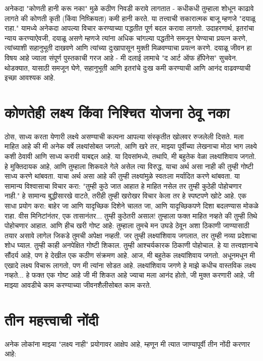 अनेकदा "कोणती हानी करू नका" मुळे कठीण निवडी करावे लागतात - कधीकधी तुम्हाला शोधून काढावे लागते की कोणती कृती (किंवा निष्क्रियता) कमी हानी करते.
या तत्त्वाची सकारात्मक बाजू म्हणजे "दयाळू राहा." यामध्ये अनेकदा आपल्या विचार करण्याच्या पद्धतीत पूर्ण बदल करावा लागतो. उदाहरणार्थ, इतरांचा न्याय करण्याऐवजी, दयाळू असणे म्हणजे त्यांना अधिक चांगल्या पद्धतीने समजून घेण्याचा प्रयत्न करणे, त्यांच्याशी सहानुभूती दाखवणे आणि त्यांच्या दुःखापासून मुक्ती मिळवण्याचा प्रयत्न करणे.
दयाळू जीवन हा विषय आहे ज्याला संपूर्ण पुस्तकाची गरज आहे - मी दलाई लामाचे "द आर्ट ऑफ हॅपिनेस" सुचवेन. थोडक्यात, यासाठी समजून घेणे, सहानुभूती आणि इतरांचे दुःख कमी करण्याची आणि आनंद वाढवण्याची इच्छा आवश्यक आहे.

\chapter{कोणतेही लक्ष्य किंवा निश्चित योजना ठेवू नका}
ठोस, साध्य करता येणारी लक्ष्ये असण्याची कल्पना आपल्या संस्कृतीत खोलवर रुजलेली दिसते. मला माहित आहे की मी अनेक वर्षे लक्ष्यांसोबत जगलो, आणि खरे तर, माझ्या पूर्वीच्या लेखनाचा मोठा भाग लक्ष्ये कशी ठेवावी आणि साध्य करावी याबद्दल आहे.
या दिवसांमध्ये, तथापि, मी बहुतेक वेळा लक्ष्यांशिवाय जगतो. हे मुक्तिदायक आहे, आणि तुम्हाला शिकवले गेले असेल त्या विरुद्ध, याचा अर्थ असा नाही की तुम्ही गोष्टी साध्य करणे थांबवता.
याचा अर्थ असा आहे की तुम्ही लक्ष्यांमुळे स्वतःला मर्यादित करणे थांबवता.
या सामान्य विश्वासाचा विचार करा: "तुम्ही कुठे जात आहात हे माहित नसेल तर तुम्ही कुठेही पोहोचणार नाही." हे सामान्य बुद्धीसारखे वाटते, तरीही तुम्ही खरोखर विचार केला तर हे स्पष्टपणे खोटे आहे. एक साधा प्रयोग करा: बाहेर जा आणि यादृच्छिक दिशेने चालत जा, आणि यादृच्छिकपणे दिशा बदलण्यास मोकळे राहा. वीस मिनिटांनंतर, एक तासानंतर... तुम्ही कुठेतरी असाल! तुम्हाला फक्त माहित नव्हते की तुम्ही तिथे पोहोचणार आहात.
आणि हीच खरी गोष्ट आहे: तुम्हाला तुमचे मन उघडे ठेवून अशा ठिकाणी जाण्यासाठी तयार असावे लागेल जिकडे तुमची अपेक्षा नव्हती. जर तुम्ही लक्ष्यांशिवाय जगलात, तर तुम्ही नव्या प्रदेशाचा शोध घ्याल. तुम्ही काही अनपेक्षित गोष्टी शिकाल. तुम्ही आश्चर्यकारक ठिकाणी पोहोचाल. हे या तत्त्वज्ञानाचे सौंदर्य आहे, पण हे देखील एक कठीण संक्रमण आहे.
आज, मी बहुतेक लक्ष्यांशिवाय जगतो. अधूनमधून मी एखादे लक्ष्य विचारू लागतो, पण मी त्यांना सोडत आहे. लक्ष्यांशिवाय जगणे हे माझे कधीच वास्तविक लक्ष्य नव्हते... हे फक्त एक गोष्ट आहे जी मी शिकत आहे ज्याचा मला आनंद होतो, जी मुक्त करणारी आहे, जी माझ्या आवडीचे काम करण्याच्या जीवनशैलीसोबत काम करते.

\chapter{तीन महत्त्वाची नोंदी}
अनेक लोकांना माझ्या "लक्ष्य नाही" प्रयोगावर आक्षेप आहे, म्हणून मी त्यात जाण्यापूर्वी तीन नोंदी करणार आहे:

